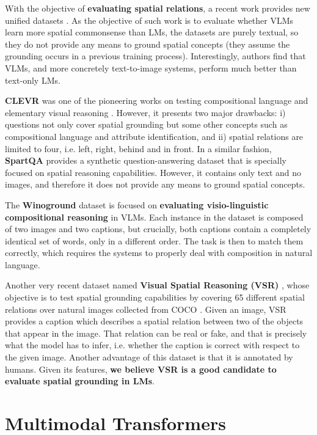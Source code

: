 With the objective of \textbf{evaluating spatial relations}, a recent work provides new unified datasets \cite{liu2022things}. As the objective of such work is to evaluate whether VLMs learn more spatial commonsense than LMs, the datasets are purely textual, so they do not provide any means to ground spatial concepts (they assume the grounding occurs in a previous training process). Interestingly, authors find that VLMs, and more concretely text-to-image systems, perform much better than text-only LMs. 

\textbf{CLEVR} was one of the pioneering works on testing compositional language and elementary visual reasoning \cite{johnson2017clevr}. However, it presents two major drawbacks: i) questions not only cover spatial grounding but some other concepts such as compositional language and attribute identification, and ii) spatial relations are limited to four, i.e. left, right, behind and in front. In a similar fashion, \textbf{SpartQA} provides a synthetic question-answering dataset that is specially focused on spatial reasoning capabilities. However, it contains only text and no images, and therefore it does not provide any means to ground spatial concepts. 

The \textbf{Winoground} dataset \cite{thrush2022winoground} is focused on \textbf{evaluating visio-linguistic compositional reasoning} in VLMs. Each instance in the dataset is composed of two images and two captions, but crucially, both captions contain a completely identical set of words, only in a different order. The task is then to match them correctly, which requires the systems to properly deal with composition in natural language.

Another very recent dataset named \textbf{Visual Spatial Reasoning (VSR)} \cite{liu2022visual}, whose objective is to test spatial grounding capabilities by covering 65 different spatial relations over natural images collected from COCO \cite{lin2014microsoft}. Given an image, VSR provides a caption which describes a spatial relation between two of the objects that appear in the image. That relation can be real or fake, and that is precisely what the model has to infer, i.e. whether the caption is correct with respect to the given image. Another advantage of this dataset is that it is annotated by humans. Given its features, \textbf{we believe VSR is a good candidate to evaluate spatial grounding in LMs}.

\section{Multimodal Transformers} \label{sec:multimodal_transformers}

